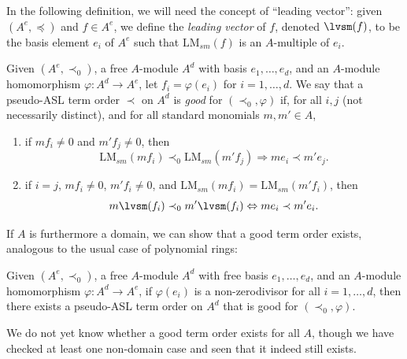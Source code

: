\documentclass[11pt,reqno]{amsart}
\newcommand{\lmsm}{\text{LM}_{sm}}
\theoremstyle{definition}
\numberwithin{equation}{section}
\begin{document}
In the following definition, we will need the concept of ``leading vector'': given $(A^e, \preceq)$ and $f \in A^e$, we define the \emph{leading vector} of $f$, denoted $\lvsm(f)$, to be the basis element $e_i$ of $A^e$ such that $\lmsm(f)$ is an $A$-multiple of $e_i$. 
\begin{definition} 
\label{def:good}
Given $(A^e, \prec_0)$, a free $A$-module $A^d$ with basis $e_1, \dotsc, e_d$, and an $A$-module homomorphism $\varphi \colon A^d \to A^e$, let $f_i = \varphi(e_i)$ for $i=1,\dotsc,d$. We say that a pseudo-ASL term order $\prec$ on $A^d$ is \emph{good} for $(\prec_0, \varphi)$ if, for all $i,j$ (not necessarily distinct), and for all standard monomials $m,m' \in A$, 
\begin{enumerate}
\item \label{def:good:one} if $mf_i \neq 0$ and $m'f_j \neq 0$, then
\[
\lmsm(mf_i) \prec_0 \lmsm(m' f_j) \Rightarrow m e_i \prec m' e_j.
\]

\item \label{def:good:two} if $i=j$, $m f_i \neq 0$, $m' f_i \neq 0$, and $\lmsm(m f_i) = \lmsm(m' f_i)$, then 
\[
m \lvsm(f_i) \prec_0 m' \lvsm(f_i) \Leftrightarrow m e_i \prec m' e_i.
\]
\end{enumerate}
\end{definition}

If $A$ is furthermore a domain, we can show that a good term order exists, analogous to the usual case of polynomial rings:

\begin{proposition}[store=obsgooddomain] 
\label{obs:good_domain}
Given $(A^e, \prec_0)$, a free $A$-module $A^d$ with free basis $e_1, \dotsc, e_d$, and an $A$-module homomorphism $\varphi \colon A^d \to A^e$, if $\varphi(e_i)$ is a non-zerodivisor for all $i=1,\dotsc,d$, then there exists a pseudo-ASL term order on $A^d$ that is good for $(\prec_0, \varphi)$.
\end{proposition}

We do not yet know whether a good term order exists for all $A$, though we have checked at least one non-domain case and seen that it indeed still exists.
\end{document}
